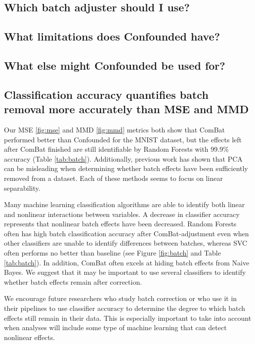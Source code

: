 \documentclass[notitlepage]{article}
\begin{document}
\subsection{Which batch adjuster should I use?}

\subsection{What limitations does Confounded have?}

\subsection{What else might Confounded be used for?}

\subsection{Classification accuracy quantifies batch removal more accurately than MSE and MMD}

Our MSE \ref{fig:mse} and MMD \ref{fig:mmd} metrics both show that ComBat performed better than Confounded for the MNIST dataset, but the effects left after ComBat finished are still identifiable by Random Forests with 99.9\% accuracy (Table \ref{tab:batch}).
Additionally, previous work \cite{dayton_classifying_2017-1} has shown that PCA can be misleading when determining whether batch effects have been sufficiently removed from a dataset.
Each of these methods seems to focus on linear separability.

Many machine learning classification algorithms are able to identify both linear and nonlinear interactions between variables.
A decrease in classifier accuracy represents that nonlinear batch effects have been decreased.
Random Forests often has high batch classification accuracy after ComBat-adjustment even when other classifiers are unable to identify differences between batches, whereas SVC often performs no better than baseline (see Figure \ref{fig:batch} and Table \ref{tab:batch}).
In addition, ComBat often excels at hiding batch effects from Naive Bayes.
We suggest that it may be important to use several classifiers to identify whether batch effects remain after correction.

We encourage future researchers who study batch correction or who use it in their pipelines to use classifier accuracy to determine the degree to which batch effects still remain in their data.
This is especially important to take into account when analyses will include some type of machine learning that can detect nonlinear effects.
\end{document}
